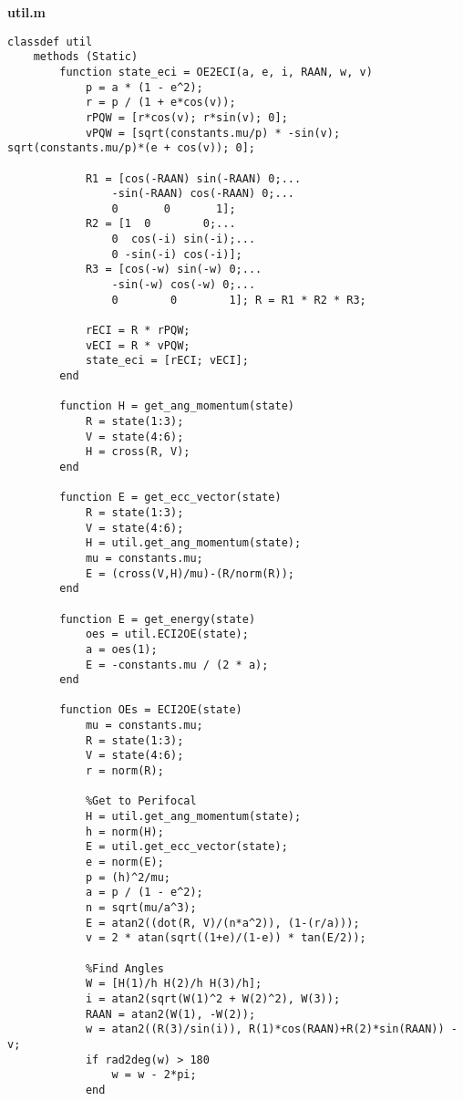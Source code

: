 \textbf{util.m}
\begin{lstlisting}
classdef util
    methods (Static)
        function state_eci = OE2ECI(a, e, i, RAAN, w, v)
            p = a * (1 - e^2);
            r = p / (1 + e*cos(v));
            rPQW = [r*cos(v); r*sin(v); 0];
            vPQW = [sqrt(constants.mu/p) * -sin(v); sqrt(constants.mu/p)*(e + cos(v)); 0];
        
            R1 = [cos(-RAAN) sin(-RAAN) 0;...
                -sin(-RAAN) cos(-RAAN) 0;...
                0       0       1];
            R2 = [1  0        0;...
                0  cos(-i) sin(-i);...
                0 -sin(-i) cos(-i)];
            R3 = [cos(-w) sin(-w) 0;...
                -sin(-w) cos(-w) 0;...
                0        0        1]; R = R1 * R2 * R3;
        
            rECI = R * rPQW;
            vECI = R * vPQW;
            state_eci = [rECI; vECI];
        end

        function H = get_ang_momentum(state)
            R = state(1:3);
            V = state(4:6);
            H = cross(R, V);
        end

        function E = get_ecc_vector(state)
            R = state(1:3);
            V = state(4:6);
            H = util.get_ang_momentum(state);
            mu = constants.mu;
            E = (cross(V,H)/mu)-(R/norm(R));
        end

        function E = get_energy(state)
            oes = util.ECI2OE(state);
            a = oes(1);
            E = -constants.mu / (2 * a);
        end

        function OEs = ECI2OE(state)
            mu = constants.mu;
            R = state(1:3);
            V = state(4:6);
            r = norm(R);
            
            %Get to Perifocal
            H = util.get_ang_momentum(state);
            h = norm(H);
            E = util.get_ecc_vector(state);
            e = norm(E);
            p = (h)^2/mu;
            a = p / (1 - e^2);
            n = sqrt(mu/a^3);
            E = atan2((dot(R, V)/(n*a^2)), (1-(r/a)));
            v = 2 * atan(sqrt((1+e)/(1-e)) * tan(E/2));
            
            %Find Angles
            W = [H(1)/h H(2)/h H(3)/h];
            i = atan2(sqrt(W(1)^2 + W(2)^2), W(3));
            RAAN = atan2(W(1), -W(2));
            w = atan2((R(3)/sin(i)), R(1)*cos(RAAN)+R(2)*sin(RAAN)) - v;
            if rad2deg(w) > 180
                w = w - 2*pi;
            end
            

\end{lstlisting}
